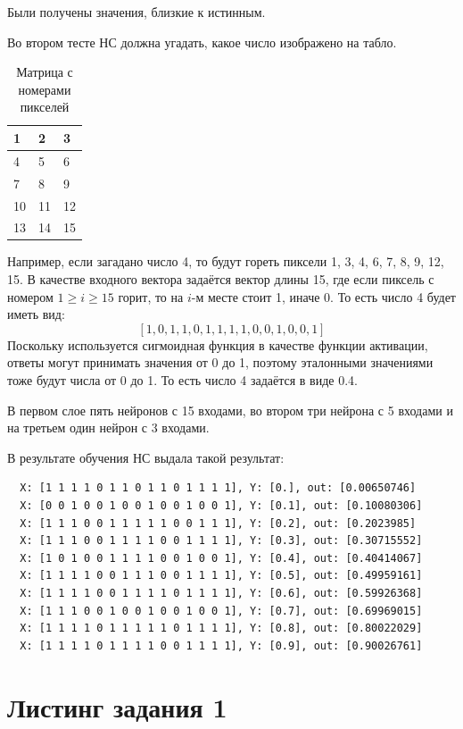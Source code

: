 \documentclass[bachelor, och, pract_otchet]{SCWorks}
\begin{document}
Были получены значения, близкие к истинным. 

Во втором тесте НС должна угадать, какое число изображено на табло.
\begin{table}[H]
  \begin{tabular}{|l|l|l|}
  \hline
  1   & 2   & 3 \\ \hline
  4   & 5   & 6 \\ \hline
  7   & 8   & 9 \\ \hline
  10  & 11  & 12 \\ \hline
  13  & 14  & 15 \\ \hline
  \end{tabular}
  \caption{Матрица с номерами пикселей}
\end{table}

Например, если загадано число 4, то будут гореть пиксели 1, 3, 4, 6, 7, 8, 9, 12, 15.
В качестве входного вектора задаётся вектор длины 15, где если пиксель с номером $1 \geq i \geq 15$ горит,
то на $i$-м месте стоит 1, иначе 0. То есть число 4 будет иметь вид:
\[ [1, 0, 1, 1, 0, 1, 1, 1, 1, 0, 0, 1, 0, 0, 1] \]
Поскольку используется сигмоидная функция в качестве функции активации, ответы могут принимать значения
от 0 до 1, поэтому эталонными значениями тоже будут числа от 0 до 1. То есть число 4 задаётся в виде 0.4.

В первом слое пять нейронов с 15 входами, во втором три нейрона
с 5 входами и на третьем один нейрон с 3 входами.

В результате обучения НС выдала такой результат:
\begin{verbatim}
  X: [1 1 1 1 0 1 1 0 1 1 0 1 1 1 1], Y: [0.], out: [0.00650746]
  X: [0 0 1 0 0 1 0 0 1 0 0 1 0 0 1], Y: [0.1], out: [0.10080306]
  X: [1 1 1 0 0 1 1 1 1 1 0 0 1 1 1], Y: [0.2], out: [0.2023985]
  X: [1 1 1 0 0 1 1 1 1 0 0 1 1 1 1], Y: [0.3], out: [0.30715552]
  X: [1 0 1 0 0 1 1 1 1 0 0 1 0 0 1], Y: [0.4], out: [0.40414067]
  X: [1 1 1 1 0 0 1 1 1 0 0 1 1 1 1], Y: [0.5], out: [0.49959161]
  X: [1 1 1 1 0 0 1 1 1 1 0 1 1 1 1], Y: [0.6], out: [0.59926368]
  X: [1 1 1 0 0 1 0 0 1 0 0 1 0 0 1], Y: [0.7], out: [0.69969015]
  X: [1 1 1 1 0 1 1 1 1 1 0 1 1 1 1], Y: [0.8], out: [0.80022029]
  X: [1 1 1 1 0 1 1 1 1 0 0 1 1 1 1], Y: [0.9], out: [0.90026761]  
\end{verbatim}

\newpage
\appendix
    \section{Листинг задания 1}
    \inputminted[fontsize=\footnotesize]{python3}{nntask1.py}
\end{document}
